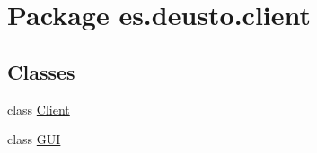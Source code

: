 \hypertarget{namespacees_1_1deusto_1_1client}{}\section{Package es.\+deusto.\+client}
\label{namespacees_1_1deusto_1_1client}
\subsection*{Classes}
\begin{DoxyCompactItemize}
\item 
class \hyperlink{classes_1_1deusto_1_1client_1_1_client}{Client}
\item 
class \hyperlink{classes_1_1deusto_1_1client_1_1_g_u_i}{G\+UI}
\end{DoxyCompactItemize}
